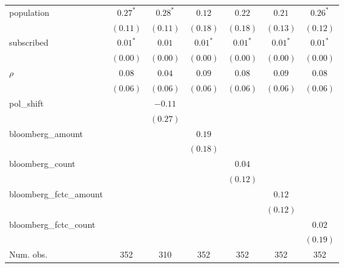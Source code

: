 \begin{table}[!h]
\begin{center}
\begin{tabular}{l c c c c c c }
population              & $0.27^{*}$   & $0.28^{*}$   & $0.12$       & $0.22$       & $0.21$       & $0.26^{*}$   \\
                        & $(0.11)$     & $(0.11)$     & $(0.18)$     & $(0.18)$     & $(0.13)$     & $(0.12)$     \\
subscribed              & $0.01^{*}$   & $0.01$       & $0.01^{*}$   & $0.01^{*}$   & $0.01^{*}$   & $0.01^{*}$   \\
                        & $(0.00)$     & $(0.00)$     & $(0.00)$     & $(0.00)$     & $(0.00)$     & $(0.00)$     \\
$\rho$                  & $0.08$       & $0.04$       & $0.09$       & $0.08$       & $0.09$       & $0.08$       \\
                        & $(0.06)$     & $(0.06)$     & $(0.06)$     & $(0.06)$     & $(0.06)$     & $(0.06)$     \\
pol\_shift              &              & $-0.11$      &              &              &              &              \\
                        &              & $(0.27)$     &              &              &              &              \\
bloomberg\_amount       &              &              & $0.19$       &              &              &              \\
                        &              &              & $(0.18)$     &              &              &              \\
bloomberg\_count        &              &              &              & $0.04$       &              &              \\
                        &              &              &              & $(0.12)$     &              &              \\
bloomberg\_fctc\_amount &              &              &              &              & $0.12$       &              \\
                        &              &              &              &              & $(0.12)$     &              \\
bloomberg\_fctc\_count  &              &              &              &              &              & $0.02$       \\
                        &              &              &              &              &              & $(0.19)$     \\
\midrule
Num. obs.               & 352          & 310          & 352          & 352          & 352          & 352          \\

\end{tabular}
\end{center}
\end{table}
